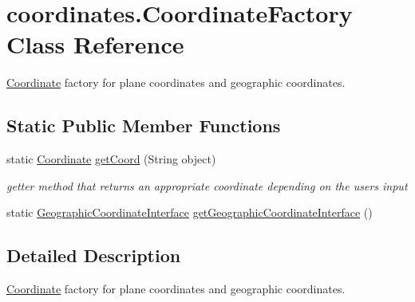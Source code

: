 \hypertarget{classcoordinates_1_1_coordinate_factory}{}\section{coordinates.\+Coordinate\+Factory Class Reference}
\label{classcoordinates_1_1_coordinate_factory}


\hyperlink{classcoordinates_1_1_coordinate}{Coordinate} factory for plane coordinates and geographic coordinates.  


\subsection*{Static Public Member Functions}
\begin{DoxyCompactItemize}
\item 
static \hyperlink{classcoordinates_1_1_coordinate}{Coordinate} \hyperlink{classcoordinates_1_1_coordinate_factory_af4662c1bf4ef8b3b9c84f9a2a1e6c4d0}{get\+Coord} (String object)
\begin{DoxyCompactList}\small\item\em getter method that returns an appropriate coordinate depending on the users input \end{DoxyCompactList}\item 
static \hyperlink{classcoordinates_1_1_geographic_coordinate_interface}{Geographic\+Coordinate\+Interface} \hyperlink{classcoordinates_1_1_coordinate_factory_a8821fec76e79c8cf44617eb95f3768dd}{get\+Geographic\+Coordinate\+Interface} ()
\end{DoxyCompactItemize}


\subsection{Detailed Description}
\hyperlink{classcoordinates_1_1_coordinate}{Coordinate} factory for plane coordinates and geographic coordinates. 

